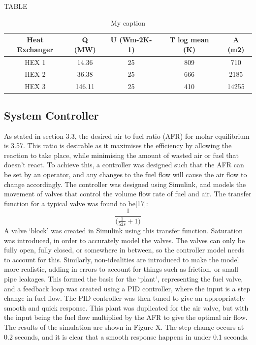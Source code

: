 TABLE
\begin{table}[h!]
\centering
\caption{My caption}
\label{my-label}
\begin{tabular}{|c|c|c|c|c|}
\hline
\textbf{Heat Exchanger} & \textbf{Q (MW)} & \textbf{U (Wm-2K-1)} & \textbf{T log mean (K)} & \textbf{A (m2)} \\ \hline
HEX 1                   & 14.36           & 25                   & 809                     & 710             \\ \hline
HEX 2                   & 36.38           & 25                   & 666                     & 2185            \\ \hline
HEX 3                   & 146.11          & 25                   & 410                     & 14255           \\ \hline
\end{tabular}
\end{table}


\subsection{System Controller}
As stated in section 3.3, the desired air to fuel ratio (AFR) for molar equilibrium is 3.57. This ratio is desirable as it maximises the efficiency by allowing the reaction to take place, while minimising the amount of wasted air or fuel that doesn’t react. To achieve this, a controller was designed such that the AFR can be set by an operator, and any changes to the fuel flow will cause the air flow to change accordingly. The controller was designed using Simulink, and models the movement of valves that control the volume flow rate of fuel and air.
The transfer function for a typical valve was found to be[17]:
\begin{equation}
\frac{1}{\Big (\frac{1}{52s}+1 \Big )}						
\end{equation}
A valve ‘block’ was created in Simulink using this transfer function. Saturation was introduced, in order to accurately model the valves. The valves can only be fully open, fully closed, or somewhere in between, so the controller model needs to account for this. Similarly, non-idealities are introduced to make the model more realistic, adding in errors to account for things such as friction, or small pipe leakages. This formed the basis for the ‘plant’, representing the fuel valve, and a feedback loop was created using a PID controller, where the input is a step change in fuel flow. The PID controller was then tuned to give an appropriately smooth and quick response. This plant was duplicated for the air valve, but with the input being the fuel flow multiplied by the AFR to give the optimal air flow. The results of the simulation are shown in Figure X. The step change occurs at 0.2 seconds, and it is clear that a smooth response happens in under 0.1 seconds.

